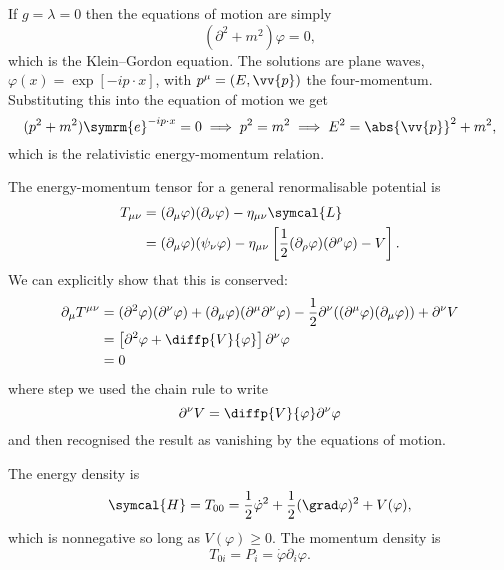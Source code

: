 \documentclass[fleqn]{NotesClass}
\newcommand{\e}{\symrm{e}}
\newcommand{\minkowskiMetric}{\eta}
\newcommand{\dalembertian}{\partial^2}
\newcommand{\lagrangianDensity}{\symcal{L}}
\newcommand{\hamiltonianDensity}{\symcal{H}}
\begin{document}
    If \(g = \lambda = 0\) then the equations of motion are simply
    \begin{equation}
        (\dalembertian + m^2)\varphi = 0,
    \end{equation}
    which is the Klein--Gordon equation.
    The solutions are plane waves, \(\varphi(x) = \exp[-ip \cdot x]\), with \(p^\mu = (E, \vv{p})\) the four-momentum.
    Substituting this into the equation of motion we get
    \begin{equation}
        (p^2 + m^2)\e^{-ip \cdot x} = 0 \implies p^2 = m^2 \implies E^2 = \abs{\vv{p}}^2 + m^2,
    \end{equation}
    which is the relativistic energy-momentum relation.
    
    The energy-momentum tensor for a general renormalisable potential is
    \begin{align}
        T_{\mu\nu} &= (\partial_\mu \varphi)(\partial_\nu \varphi) - \minkowskiMetric_{\mu\nu}\lagrangianDensity\\
        &= (\partial_\mu \varphi)(\psi_\nu \varphi) - \minkowskiMetric_{\mu\nu} \left[ \frac{1}{2} (\partial_\rho \varphi)(\partial^\rho \varphi) - V \right].
    \end{align}
    We can explicitly show that this is conserved:
    \begin{align}
        \partial_\mu T^{\mu\nu} &= (\dalembertian \varphi)(\partial^\nu \varphi) + (\partial_\mu \varphi) (\partial^\mu \partial^\nu \varphi) - \frac{1}{2} \partial^\nu ((\partial^\mu \varphi)(\partial_\mu \varphi)) + \partial^\nu V\\
        &= \left[  \dalembertian \varphi + \diffp{V}{\varphi}  \right] \partial^\nu \varphi\\
        &= 0
    \end{align}
    where step we used the chain rule to write
    \begin{equation}
        \partial^\nu V = \diffp{V}{\varphi} \partial^\nu \varphi
    \end{equation}
    and then recognised the result as vanishing by the equations of motion.
    
    The energy density is
    \begin{equation}
        \hamiltonianDensity = T_{00} = \frac{1}{2}\dot{\varphi}^2 + \frac{1}{2}(\grad\varphi)^2 + V(\varphi),
    \end{equation}
    which is nonnegative so long as \(V(\varphi) \ge 0\).
    The momentum density is
    \begin{equation}
        T_{0i} = P_i = \dot{\varphi} \partial_i \varphi.
    \end{equation}
\end{document}
